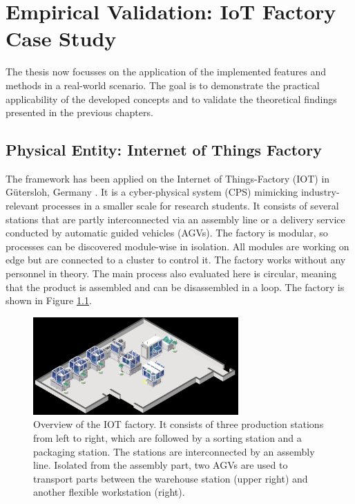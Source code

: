 \chapter{Empirical Validation: IoT Factory Case Study}
\label{chap:case-study}

The thesis now focusses on the application of the implemented features and methods in a real-world scenario. The goal is to demonstrate the practical applicability of the developed concepts and to validate the theoretical findings presented in the previous chapters.

\section{Physical Entity: Internet of Things Factory}
\label{sec:factory}
The framework has been applied on the Internet of Things-Factory (IOT) in Gütersloh, Germany \autocite{IoTFactory2024}. It is a cyber-physical system (CPS) \autocite{baheti2011cyber} mimicking industry-relevant processes in a smaller scale for research students. It consists of several stations that are partly interconnected via an assembly line or a delivery service conducted by automatic guided vehicles (AGVs). The factory is modular, so processes can be discovered module-wise in isolation. All modules are working on edge but are connected to a cluster to control it. The factory works without any personnel in theory. The main process also evaluated here is circular, meaning that the product is assembled and can be disassembled in a loop. The factory is shown in Figure \ref{fig:iotoverview}.

\begin{figure}[htbp]
  \centering
  \includegraphics[width=0.7\textwidth]{figures/iot1.png}
  \caption{Overview of the IOT factory. It consists of three production stations from left to right, which are followed by a sorting station and a packaging station. The stations are interconnected by an assembly line. Isolated from the assembly part, two AGVs are used to transport parts between the warehouse station (upper right) and another flexible workstation (right).}
  \label{fig:iotoverview}
\end{figure}

